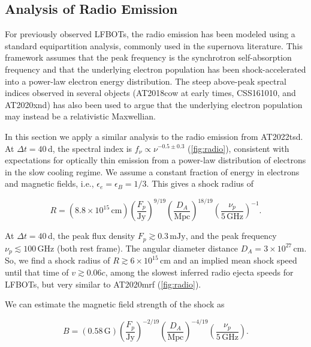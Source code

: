 \documentclass{nature_plusfigure}
\newcommand{\at}{AT2022tsd}
\begin{document}
\begin{methods}
\section{Analysis of Radio Emission}
\label{sec:radio-analysis}

For previously observed LFBOTs, the radio emission has been modeled using a standard equipartition analysis, commonly used in the supernova literature\cite{Chevalier1998}. This framework assumes that the peak frequency is the synchrotron self-absorption frequency\cite{Ho2019,Margutti2019,Coppejans2020,Ho2022_AT2020xnd,Bright2022,Yao2022} and that the underlying electron population has been shock-accelerated into a power-law electron energy distribution. The steep above-peak spectral indices observed in several objects (AT2018cow at early times\cite{Ho2019}, CSS161010\cite{Coppejans2020}, and AT2020xnd\cite{Ho2022_AT2020xnd}) has also been used to argue that the underlying electron population may instead be a relativistic Maxwellian\cite{Margalit2021}.

In this section we apply a similar analysis to the radio emission from \at. At $\Delta t=40\,$d, the spectral index is $f_\nu \propto \nu^{-0.5\pm0.3}$ (\ref{fig:radio}), consistent with expectations for optically thin emission from a power-law distribution of electrons in the slow cooling regime. We assume a constant fraction of energy in electrons and magnetic fields, i.e., $\epsilon_e=\epsilon_B=1/3$. This gives a shock radius of\cite{Chevalier1998}

\begin{equation}
    R = (8.8 \times 10^{15}\,\mathrm{cm}) \left(\frac{F_p}{\mathrm{Jy}}\right)^{9/19} \left(\frac{D_A}{\mathrm{Mpc}}\right)^{18/19} \left(\frac{\nu_p}{5\,\mathrm{GHz}}\right)^{-1}.
\end{equation}

\noindent At $\Delta t=40\,$d, the peak flux density $F_p\gtrsim0.3\,\mathrm{mJy}$, and the peak frequency $\nu_p\lesssim100\,\mathrm{GHz}$ (both rest frame). The angular diameter distance $D_A=3\times10^{27}\,\mathrm{cm}$. So, we find a shock radius of $R\gtrsim6\times10^{15}\,$cm and an implied mean shock speed until that time of $v\gtrsim0.06c$, among the slowest inferred radio ejecta speeds for LFBOTs, but very similar to AT2020mrf\cite{Yao2022} (\ref{fig:radio}). 

We can estimate the magnetic field strength of the shock as\cite{Chevalier1998}

\begin{equation}
    B = (0.58\,\mathrm{G}) \left(\frac{F_p}{\mathrm{Jy}}\right)^{-2/19} \left(\frac{D_A}{\mathrm{Mpc}}\right)^{-4/19} \left(\frac{\nu_p}{5\,\mathrm{GHz}}\right).
\end{equation}


\end{methods}
\end{document}
